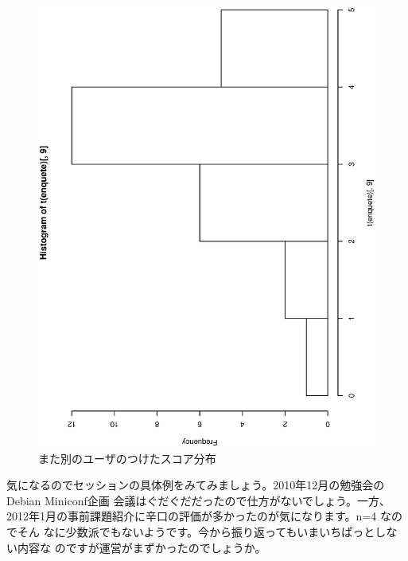 \documentclass[mingoth,a4paper]{jsarticle}
\begin{document}
\begin{figure}[h]
\begin{center}
 \includegraphics[width=0.8\hsize,angle=270]{image201301/score_hist_9.eps}

 \caption{また別のユーザのつけたスコア分布}
 \label{fig:example-user-score-2}
\end{center}
\end{figure}

気になるのでセッションの具体例をみてみましょう。2010年12月の勉強会のDebian Miniconf企画
会議はぐだぐだだったので仕方がないでしょう。一方、
2012年1月の事前課題紹介に辛口の評価が多かったのが気になります。n=4 なのでそん
なに少数派でもないようです。今から振り返ってもいまいちぱっとしない内容な
のですが運営がまずかったのでしょうか。
\end{document}
